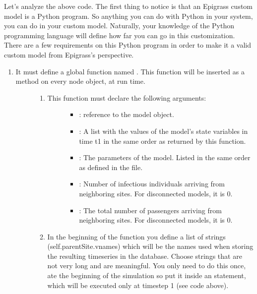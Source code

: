 \documentclass[letterpaper,10pt,english]{sphinxmanual}
\begin{document}
Let’s analyze the above code. The first thing to notice is that an Epigrass custom model is a Python program. So anything you can do with Python in your system, you can do in your custom model. Naturally, your knowledge of the Python programming language will define how far you can go in this customization. There are a few requirements on this Python program in order to make it a valid custom model from Epigrass’s perspective.
\begin{enumerate}
%
\item {} \begin{description}
\item[{It must define a global function named . This function will be inserted as a method on every node object, at run time.}] \leavevmode\begin{enumerate}
%
\item {} \begin{description}
\item[{This function must declare the following arguments:}] \leavevmode\begin{itemize}
\item {} 
: reference to the model object.

\item {} 
: A list with the values of the model’s state variables in time t\sphinxhyphen{}1 in the same order as returned by this function.

\item {} 
: The parameters of the model. Listed in the same order as defined in the  file.

\item {} 
: Number of infectious individuals arriving from neighboring sites. For disconnected models, it is 0.

\item {} 
: The total number of passengers arriving from neighboring sites. For disconnected models, it is 0.

\end{itemize}

\end{description}

\item {} 
In the beginning of the function you define a list of strings (self.parentSite.vnames) which will be the names used when storing the resulting time\sphinxhyphen{}series in the database. Choose strings that are not very long and are meaningful. You only need to do this once, ate the beginning of the simulation so put it inside an  statement, which will be executed only at time\sphinxhyphen{}step 1 (see code above).


\end{enumerate}
\end{description}
\end{enumerate}
\end{document}
